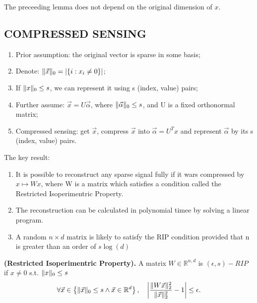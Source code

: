The preceeding lemma does not depend on the original dimension of $ x $.

\subsection{COMPRESSED SENSING}%
\label{sub:compressed_sensing}

\begin{enumerate}
    \item Prior assumption: the original vector is sparse in some basis;
    \item Denote: $ \Arrowvert \vec{x} \Arrowvert_0 = \left| \left\{ i: x_i \ne 0 \right\} \right|$;
    \item If $ \Arrowvert x \Arrowvert_0 \le s $, we can represent it using s (index, value) pairs;
    \item Further assume: $ \vec{x} = U \vec{\alpha} $, where $ \Arrowvert  \vec{\alpha}  \Arrowvert_0 \le s$, and U is a fixed orthonormal matrix; 
    \item Compressed sensing: get $ \vec{x} $, compress $ \vec{x} $ into $ \vec{\alpha} = U^T x $ and represent $ \vec{\alpha} $ by its s (index, value) pairs.
\end{enumerate}

The key result:
\begin{enumerate}
    \item It is possible to reconstruct any sparse signal fully if it wars compressed by $ x \mapsto Wx $, where W is a matrix which satisfies a condition called the Restricted Isoperimentric Property.
    \item The reconstruction can be calculated in polynomial timee by solving a linear program.
    \item A random $ n\times d $ matrix is likely to satisfy the RIP condition provided that n is greater than an order of $ s\log(d) $
\end{enumerate}

\begin{definition}
    \textbf{(Restricted Isoperimentric Property).}
    A matrix $ W \in \mathbb{R}^{n,d} $ is $ (\epsilon,s) -RIP $ if $ x \ne 0 $ {s.t.} $ \Arrowvert x \Arrowvert_0 \le s$
    \[
        \forall \vec{x} \in \left\{ \Arrowvert \vec{x} \Arrowvert_0 \le s \wedge \vec{x} \in \mathbb{R}^{d} \right\},
        \quad \left| \frac{ \Arrowvert W \vec{x} \Arrowvert^2_2}{ \Arrowvert \vec{x} \Arrowvert^2_2}  - 1 \right| \le \epsilon.
    \]
\end{definition}

